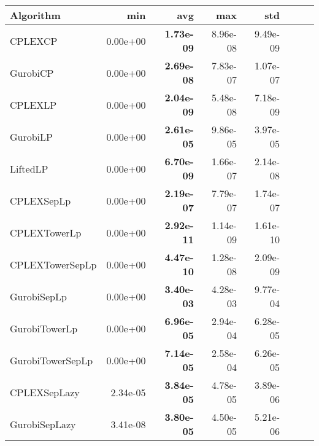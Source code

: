 \begin{tabular}{lrrrrrrr}
Algorithm & min & avg & max & std
\\
\hline
CPLEXCP&0.00e+00& \bf1.73e-09& 8.96e-08& 9.49e-09\\
GurobiCP&0.00e+00& \bf2.69e-08& 7.83e-07& 1.07e-07\\
CPLEXLP&0.00e+00& \bf2.04e-09& 5.48e-08& 7.18e-09\\
GurobiLP&0.00e+00& \bf2.61e-05& 9.86e-05& 3.97e-05\\
LiftedLP&0.00e+00& \bf6.70e-09& 1.66e-07& 2.14e-08\\
CPLEXSepLp&0.00e+00& \bf2.19e-07& 7.79e-07& 1.74e-07\\
CPLEXTowerLp&0.00e+00& \bf2.92e-11& 1.14e-09& 1.61e-10\\
CPLEXTowerSepLp&0.00e+00& \bf4.47e-10& 1.28e-08& 2.09e-09\\
GurobiSepLp&0.00e+00& \bf3.40e-03& 4.28e-03& 9.77e-04\\
GurobiTowerLp&0.00e+00& \bf6.96e-05& 2.94e-04& 6.28e-05\\
GurobiTowerSepLp&0.00e+00& \bf7.14e-05& 2.58e-04& 6.26e-05\\
CPLEXSepLazy&2.34e-05& \bf3.84e-05& 4.78e-05& 3.89e-06\\
GurobiSepLazy&3.41e-08& \bf3.80e-05& 4.50e-05& 5.21e-06
\end{tabular}
